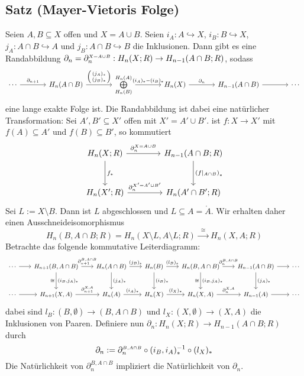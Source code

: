 \subsection{Satz (Mayer-Vietoris Folge)} %
\label{sub:92}
Seien $A,B \subseteq X$ offen und $X=A \cup B$. Seien $i_A \colon A \hookrightarrow X$, $i_B \colon B \hookrightarrow X$, $j_A \colon A \cap B \hookrightarrow A$ und 
$j_B \colon A \cap B \hookrightarrow B$ die Inklusionen. Dann gibt es eine Randabbildung $\partial_n = \partial^{\scriptscriptstyle X=A\cup B}_n : H_n(X;R) \to H_{n-1}(A \cap B;R)$, sodass
\[
	\begin{tikzcd}[column sep=3.7em]
		\cdots \rar["\partial_{n+1}"] & H_n(A \cap B) \rar["{\begin{psmallmatrix}(j_A)_* \\ (j_B)_* \end{psmallmatrix}}"] 
		&  \bigoplus\limits_{H_n(B)}^{H_n(A)} \rar["(i_A)_* - (i_B)_*"] 
		& H_n(X) \rar["\partial_n"] & H_{n-1}(A\cap B) \rar & \cdots
	\end{tikzcd}
\]
eine lange exakte Folge ist. Die Randabbildung ist dabei eine natürlicher Transformation: Sei $A',B' \subseteq X'$ offen mit $X'=A' \cup B'$. ist $f :X \to X'$ mit
$f(A) \subseteq A'$ und $f(B) \subseteq B'$, so kommutiert
\[
	\begin{tikzcd}[column sep=4em, row sep=3em]
		H_n(X;R) \rar["\rand{X=A \cup B}_n"] \dar["f_*"]  & H_{n-1}(A \cap B;R) \dar["\enbrace*{f|_{A \cap B}}_*"] \\
		H_n(X';R) \rar["\rand{X'=A' \cup B'}_n"] & H_n(A' \cap B';R)
	\end{tikzcd}
\]
Sei $L := X \setminus B$. Dann ist $L$ abgeschlossen und $L \subseteq A=\mathring{A}$. Wir erhalten daher einen Ausschneideisomorphismus 
\[
	H_n(B,A \cap B;R) = H_n(X \setminus L, A \setminus L;R) \xrightarrow{\enspace \cong \enspace} H_n(X,A;R) 
\]
Betrachte das folgende kommutative Leiterdiagramm: 
\[
	\begin{tikzcd}[font=\small, column sep=1.8em, row sep=2.5em]
		\cdots \rar & H_{n+1}(B,A \cap B) \rar["\rand{B,A \cap B}_{n+1}"] \arrow{d}{(i_B,j_A)_*}[swap]{\cong} & H_n(A \cap B) \rar["(j_B)_*"] \dar["(j_A)_*"] 
		& H_n(B) \rar["(l_B)_*"] \dar["(i_B)_*"] & H_n(B,A \cap B) \rar["\rand{B,A\cap B}_n"] \arrow{d}{(i_B,j_A)_*}[swap]{\cong}
		& H_{n-1}(A \cap B) \rar \dar["(j_A)_*"] & \cdots \\
		\cdots \rar & H_{n+1}(X,A) \rar["\rand{X,A}_{n+1}"] & H_n(A) \rar["(i_A)_*"] & H_n(X) \rar["(l_X)_*"] & H_n(X,A) \rar["\partial_n^{X,A}"] & H_{n-1}(A) \rar & \cdots
	\end{tikzcd}
\]
dabei sind $l_B \colon (B,\emptyset) \to (B,A \cap B)$ und $l_X \colon (X, \emptyset) \to (X,A)$ die Inklusionen von Paaren.
Definiere nun $\partial_n \colon H_n(X;R) \to H_{n-1}(A\cap B;R)$ durch
\[
	\partial_n := \partial^{\scriptscriptstyle B, A\cap B}_n \circ  (i_B,i_A)_*^{-1} \circ (l_X)_* 
\]
Die Natürlichkeit von $\partial_{n}^{B,A \cap B}$ impliziert die Natürlichkeit von $\partial_n$. \smallskip \\

